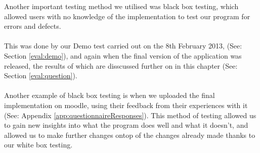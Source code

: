 Another important testing method we utilised was black box testing,
which allowed users with no knowledge of the implementation to test
our program for errors and defects. \\ \\
This was done by our Demo test carried out on the 8th February 2013, (See:
Section \ref{eval:demo}), and again when the final version of the application
was released, the results of which are disscussed further on in this chapter 
(See: Section \ref{eval:question}). \\ \\
Another example of black box testing is when we uploaded the final
implementation on moodle, using their feedback from their experiences
with it (See: Appendix \ref{app:questionnaireResponses}).
This method of testing allowed us to gain new insights into what the
program does well and what it doesn't, and allowed us to make further
changes ontop of the changes already made thanks to our white box
testing.







